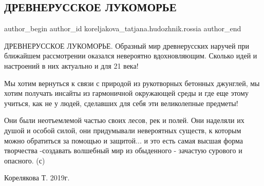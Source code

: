  
 
 
 
 
 
\subsection{ДРЕВНЕРУССКОЕ ЛУКОМОРЬЕ}
\label{sec:16_11_2019.fb.koreljakova_tatjana.hudozhnik.rossia.1.drevnerusskoje_lukomorje}
 
\ifcmt
 author_begin
   author_id koreljakova_tatjana.hudozhnik.rossia
 author_end
\fi

ДРЕВНЕРУССКОЕ ЛУКОМОРЬЕ. Образный мир древнерусских наручей при ближайшем
рассмотрении оказался невероятно вдохновляющим. Сколько идей и настроений в них
актуально и для 21 века! 


Мы хотим вернуться к связи с природой из рукотворных
бетонных джунглей, мы хотим получать инсайты из гармоничной окружающей среды и
где еще этому учиться, как не у людей, сделавших для себя эти великолепные
предметы! 


Они были неотъемлемой частью своих лесов, рек и полей. Они наделяли
их душой и особой силой, они придумывали невероятных существ, к которым можно
обратиться за помощью и защитой... и это есть самая высшая форма творчества
-создавать волшебный мир из обыденного - зачастую сурового и опасного. (с)

Корелякова Т. 2019г.

